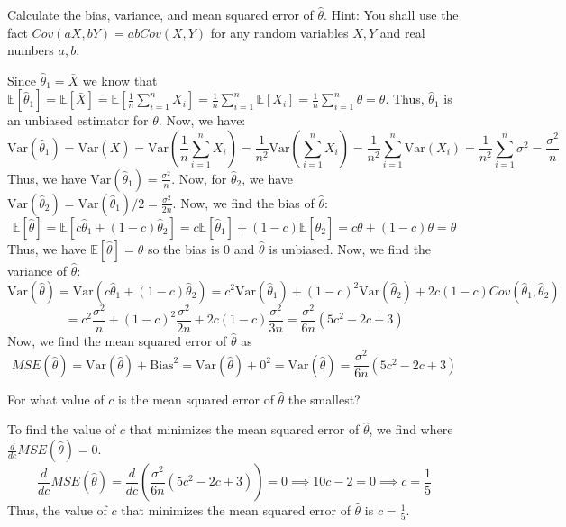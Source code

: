 \documentclass{article}
\newcommand{\E}{\mathbb{E}}
\newcommand{\V}{\text{Var}}
\begin{document}
\begin{probset}
\begin{prob}
    \begin{subprobset}
    \begin{subprob}
        Calculate the bias, variance, and mean squared error of $\hat{\theta}$. Hint: You shall use the fact $Cov(aX, bY ) = ab Cov(X, Y )$ for any random variables $X, Y$ and real numbers $a, b$.

        \begin{soln}
            Since $\hat\theta_1 = \bar X$ we know that $\E[\hat\theta_1] = \E[\bar X] = \E\left[ \frac{1}{n} \sum_{i=1}^n X_i \right] = \frac{1}{n} \sum_{i=1}^n \E[X_i] = \frac{1}{n} \sum_{i=1}^n \theta = \theta$. Thus, $\hat\theta_1$ is an unbiased estimator for $\theta$. Now, we have:
            \[
                \V(\hat\theta_1) = \V(\bar X) = \V\left( \frac{1}{n} \sum_{i=1}^n X_i \right) = \frac{1}{n^2} \V\left( \sum_{i=1}^n X_i \right) = \frac{1}{n^2} \sum_{i=1}^n \V(X_i) = \frac{1}{n^2} \sum_{i=1}^n \sigma^2 = \frac{\sigma^2}{n}
            \]
            Thus, we have $\V(\hat\theta_1) = \frac{\sigma^2}{n}$. Now, for $\hat\theta_2$, we have $\V(\hat\theta_2) = \V(\hat\theta_1)/2 = \frac{\sigma^2}{2n}$. Now, we find the bias of $\hat\theta$:
            \[
                \E[\hat\theta] = \E[c\hat\theta_1 + (1 - c)\hat\theta_2] = c\E[\hat\theta_1] + (1 - c)\E[\hat\theta_2] = c\theta + (1 - c)\theta = \theta
            \]
            Thus, we have $\E[\hat\theta] = \theta$ so the bias is 0 and $\hat\theta$ is unbiased. Now, we find the variance of $\hat\theta$:
            \[
                \V(\hat\theta) = \V(c\hat\theta_1 + (1 - c)\hat\theta_2) = c^2\V(\hat\theta_1) + (1 - c)^2\V(\hat\theta_2) + 2c(1 - c)Cov(\hat\theta_1, \hat\theta_2)
            \]
            \[
                = c^2\frac{\sigma^2}{n} + (1 - c)^2\frac{\sigma^2}{2n} + 2c(1 - c)\frac{\sigma^2}{3n} = \frac{\sigma^2}{6n}(5c^2 - 2c + 3)
            \]
            Now, we find the mean squared error of $\hat\theta$ as 
            \[
                MSE(\hat\theta) = \V(\hat\theta) + \text{Bias}^2 = \V(\hat\theta) + 0^2 = \V(\hat\theta) = \frac{\sigma^2}{6n}(5c^2 - 2c + 3)
            \]
        \end{soln}
    \end{subprob}

    \begin{subprob}
        For what value of $c$ is the mean squared error of $\hat{\theta}$ the smallest?

        \begin{soln}
            To find the value of $c$ that minimizes the mean squared error of $\hat\theta$, we find where $\frac{d}{dc} MSE(\hat\theta) = 0$.
            \[
                \frac{d}{dc} MSE(\hat\theta) = \frac{d}{dc} \left(\frac{\sigma^2}{6n}(5c^2 - 2c + 3)\right) = 0 \implies 10c - 2 = 0 \implies c = \frac{1}{5}
            \]
            Thus, the value of $c$ that minimizes the mean squared error of $\hat\theta$ is $c = \frac{1}{5}$.
        \end{soln}
    \end{subprob}
    \end{subprobset}
\end{prob}


\end{probset}
\end{document}

